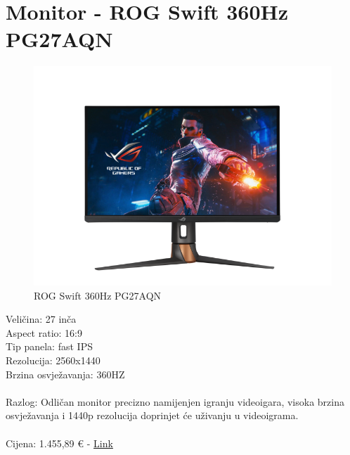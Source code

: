 \documentclass{report}
\begin{document}
\section{Monitor - ROG Swift 360Hz PG27AQN}
\begin{figure}[H]
    \centering
    \includegraphics[scale=0.5]{monitor.png}
    \caption{ROG Swift 360Hz PG27AQN}
    \label{fig:monitor}
\end{figure}
Veličina: 27 inča\\Aspect ratio: 16:9\\Tip panela: fast IPS\\Rezolucija: 2560x1440\\Brzina osvježavanja: 360HZ\\\\Razlog: Odličan monitor precizno namijenjen igranju videoigara, visoka brzina osvježavanja i 1440p rezolucija doprinjet će uživanju u videoigrama.\\\\Cijena: 1.455,89 € - \href{https://www.instar-informatika.hr/monitor-asus-27-rog-swift-pg27aqn-fast-ips-gaming-nvidia-g-sync-36/224248/product/?utm\_source=nabava.net\&utm\_campaign=nabava.net\&utm\_medium=click}{Link}

\pagebreak
\end{document}
